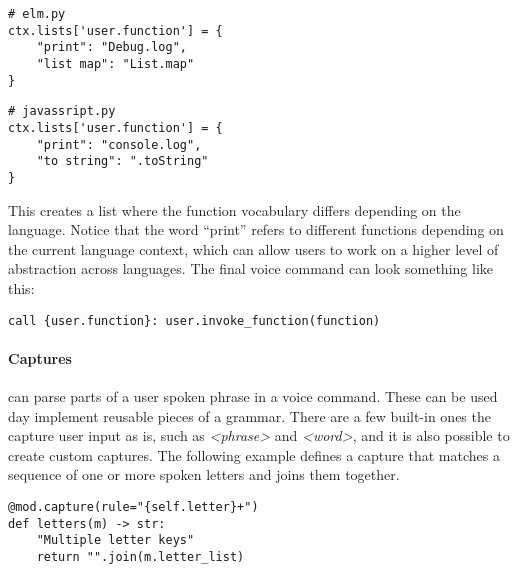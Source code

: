 \documentclass[../thesis.tex]{subfiles}
\begin{document}
\begin{minipage}{0.5\textwidth}
\begin{verbatim}
# elm.py
ctx.lists['user.function'] = {
    "print": "Debug.log",
    "list map": "List.map"
}
\end{verbatim}
\end{minipage}
\vline
\begin{minipage}{0.5\textwidth}
\begin{verbatim}
# javassript.py
ctx.lists['user.function'] = {
    "print": "console.log",
    "to string": ".toString"
}
\end{verbatim}
\end{minipage}
This creates a list where the function vocabulary differs depending on the language.
Notice that the word ``print'' refers to different functions depending on the current language context,
which can allow users to work on a higher level of abstraction across languages.
The final voice command can look something like this:
\begin{verbatim}
call {user.function}: user.invoke_function(function) 
\end{verbatim}

\paragraph{Captures}
can parse parts of a user spoken phrase in a voice command.
These can be used day implement reusable pieces of a grammar.
There are a few built-in ones the capture user input as is, such as \textit{<phrase>} and \textit{<word>}, 
and it is also possible to create custom captures.
The following example defines a capture that matches a sequence of one or more spoken letters
and joins them together.
\begin{verbatim}
@mod.capture(rule="{self.letter}+")
def letters(m) -> str:
    "Multiple letter keys"
    return "".join(m.letter_list)
\end{verbatim}


\end{document}
